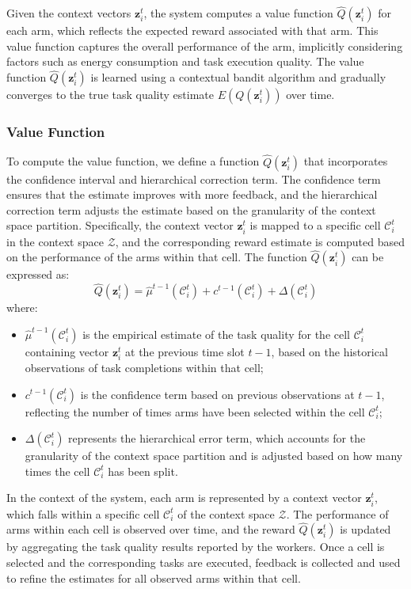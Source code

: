 Given the context vectors \( \mathbf{z}_i^t \), the system computes a value function \( \hat{Q}(\mathbf{z}_i^t) \) for each arm, which reflects the expected reward associated with that arm. This value function captures the overall performance of the arm, implicitly considering factors such as energy consumption and task execution quality. The value function \( \hat{Q}(\mathbf{z}_i^t) \) is learned using a contextual bandit algorithm and gradually converges to the true task quality estimate \( E(Q(\mathbf{z}_i^t)) \) over time.


\subsubsection{Value Function}
To compute the value function, we define a function \( \hat{Q}(\mathbf{z}_i^t) \) that incorporates the confidence interval and hierarchical correction term. The confidence term ensures that the estimate improves with more feedback, and the hierarchical correction term adjusts the estimate based on the granularity of the context space partition. Specifically, the context vector \( \mathbf{z}_i^t \) is mapped to a specific cell \( \mathcal{C}_i^t \) in the context space \( \mathcal{Z} \), and the corresponding reward estimate is computed based on the performance of the arms within that cell. The function \( \hat{Q}(\mathbf{z}_i^t) \) can be expressed as:
\[
\hat{Q}(\mathbf{z}_i^t) = \hat{\mu}^{t-1}(\mathcal{C}_i^t) + c^{t-1}(\mathcal{C}_i^t) + \Delta(\mathcal{C}_i^t)
\]
where:
\begin{itemize}
    \item \( \hat{\mu}^{t-1}(\mathcal{C}_i^t) \) is the empirical estimate of the task quality for the cell \( \mathcal{C}_i^t \) containing vector \( \mathbf{z}_i^t \) at the previous time slot \( t-1 \), based on the historical observations of task completions within that cell;
    \item \( c^{t-1}(\mathcal{C}_i^t) \) is the confidence term based on previous observations at \( t-1 \), reflecting the number of times arms have been selected within the cell \( \mathcal{C}_i^t \);
    \item \( \Delta(\mathcal{C}_i^t) \) represents the hierarchical error term, which accounts for the granularity of the context space partition and is adjusted based on how many times the cell \( \mathcal{C}_i^t \) has been split.
\end{itemize}

In the context of the system, each arm is represented by a context vector \( \mathbf{z}_i^t \), which falls within a specific cell \( \mathcal{C}_i^t \) of the context space \( \mathcal{Z} \). The performance of arms within each cell is observed over time, and the reward \( \hat{Q}(\mathbf{z}_i^t) \) is updated by aggregating the task quality results reported by the workers. Once a cell is selected and the corresponding tasks are executed, feedback is collected and used to refine the estimates for all observed arms within that cell.

